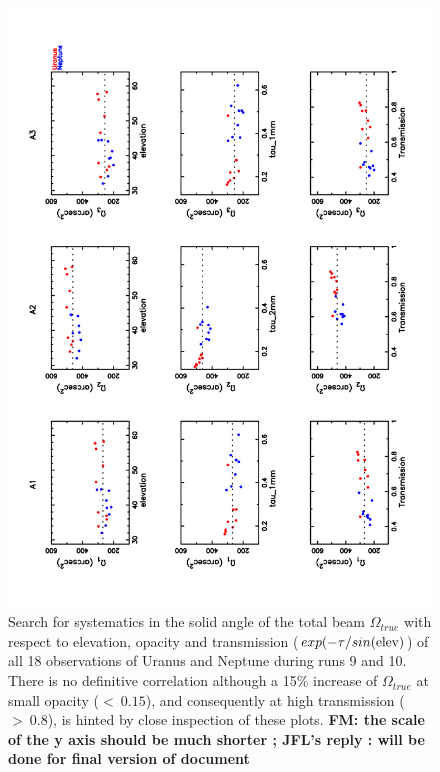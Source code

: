 \begin{figure}[p]
\begin{center}
  \includegraphics[clip, angle=-90, scale=0.6]{Figures/Omega_True_vs_elev_tau_transmission.pdf}
  \caption[Stability tests of the total beam solid angle]{Search for systematics in the solid angle of the total beam $\Omega_{true}$
   with respect to elevation, opacity and transmission
   ($exp(-\tau/sin({\rm elev})$) of all 18 observations
   of Uranus and Neptune during runs 9 and 10. There is no definitive correlation although a 15\% increase
   of $\Omega_{true}$ at small opacity ($<~0.15$), and consequently
  at high transmission ($>~0.8$), is hinted by close inspection of these plots. {\bf FM: the scale of the
    y axis should be much shorter ; JFL's reply : will be done for final
    version of document}}
\label{fig:Osystematics}
\end{center}
\end{figure}


